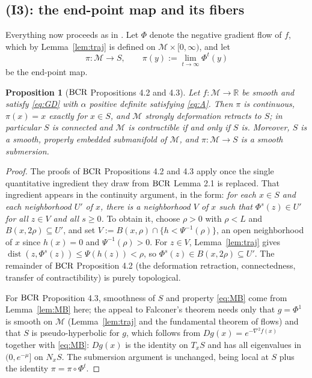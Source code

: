 \documentclass[11pt]{article}
\theoremstyle{plain}
\newtheorem{prop}[thm]{Proposition}
\theoremstyle{definition}
\theoremstyle{remark}
\newcommand{\M}{\mathcal{M}}
\newcommand{\R}{\mathbb{R}}
\DeclareMathOperator{\dist}{dist}
\newcommand{\bcr}{\textup{BCR}}
\begin{document}
\subsection{(I3): the end-point map and its fibers}

Everything now proceeds as in \cite{BCR2026}. Let $\Phi$ denote the negative
gradient flow of $f$, which by Lemma~\ref{lem:traj} is defined on
$\M\times[0,\infty)$, and let
\begin{equation}\label{eq:pi}
  \pi\colon\M\to S, \qquad \pi(y) := \lim_{t\to\infty}\Phi^t(y)
\end{equation}
be the end-point map.

\begin{prop}[$\bcr$ Propositions 4.2 and 4.3]\label{prop:pi}
Let $f\colon\M\to\R$ be smooth and satisfy \eqref{eq:GD} with $\alpha$ positive
definite satisfying \eqref{eq:A}. Then $\pi$ is continuous, $\pi(x)=x$ exactly
for $x\in S$, and $\M$ strongly deformation retracts to $S$; in particular $S$
is connected and $\M$ is contractible if and only if $S$ is. Moreover, $S$ is a
smooth, properly embedded submanifold of $\M$, and $\pi\colon\M\to S$ is a
smooth submersion.
\end{prop}

\begin{proof}
The proofs of $\bcr$ Propositions 4.2 and 4.3 apply once the single quantitative
ingredient they draw from $\bcr$ Lemma 2.1 is replaced. That ingredient appears
in the continuity argument, in the form: \emph{for each $x\in S$ and each
neighborhood $U'$ of $x$, there is a neighborhood $V$ of $x$ such that
$\Phi^s(z)\in U'$ for all $z\in V$ and all $s\ge0$.} To obtain it, choose
$\rho>0$ with $\rho<L$ and $B(x,2\rho)\subseteq U'$, and set
$V := B(x,\rho)\cap\{h < \Psi^{-1}(\rho)\}$, an open neighborhood of $x$ since
$h(x)=0$ and $\Psi^{-1}(\rho)>0$. For $z\in V$, Lemma~\ref{lem:traj} gives
$\dist(z,\Phi^s(z)) \le \Psi(h(z)) < \rho$, so $\Phi^s(z)\in B(x,2\rho)\subseteq U'$.
The remainder of $\bcr$ Proposition 4.2 (the deformation retraction, connectedness,
transfer of contractibility) is purely topological.

For $\bcr$ Proposition 4.3, smoothness of $S$ and property \eqref{eq:MB} come
from Lemma~\ref{lem:MB} here; the appeal to Falconer's theorem
\cite[Thm.~5.1]{Falconer1983} needs only that $g=\Phi^1$ is smooth on $\M$
(Lemma~\ref{lem:traj} and the fundamental theorem of flows) and that $S$ is
pseudo-hyperbolic for $g$, which follows from $Dg(x)=e^{-\nabla^2 f(x)}$ together
with \eqref{eq:MB}: $Dg(x)$ is the identity on $T_xS$ and has all eigenvalues in
$(0,e^{-\mu}]$ on $N_xS$. The submersion argument is unchanged, being local at
$S$ plus the identity $\pi = \pi\circ\Phi^t$.
\end{proof}
\end{document}
